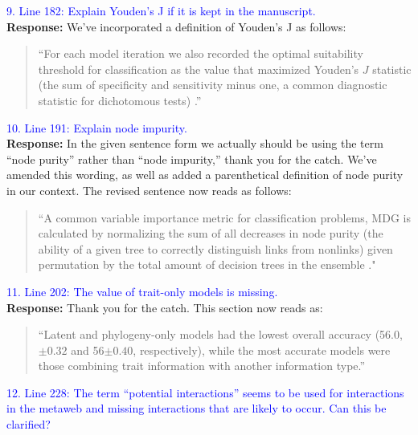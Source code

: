 \documentclass{article}
\begin{document}
\textcolor{blue}{9. Line 182: Explain Youden’s J if it is kept in the manuscript.} \\
\textbf{Response:} We’ve incorporated a definition of Youden’s J as follows: 
\begin{quote}
“For each model iteration we also recorded the optimal suitability threshold for classification as the value that maximized Youden's $J$ statistic (the sum of specificity and sensitivity minus one, a common diagnostic statistic for dichotomous tests) \cite{youden1950index}.”
\end{quote}

\textcolor{blue}{10. Line 191: Explain node impurity.} \\
\textbf{Response:} In the given sentence form we actually should be using the term “node purity” rather than “node impurity,” thank you for the catch. We’ve amended this wording, as well as added a parenthetical definition of node purity in our context. The revised sentence now reads as follows:  
\begin{quote}
``A common variable importance metric for classification problems, MDG is calculated by normalizing the sum of all decreases in node purity (the ability of a given tree to correctly distinguish links from nonlinks) given permutation by the total amount of decision trees in the ensemble \cite{khalilia2011predicting, calle2011stability}."
\end{quote}

\textcolor{blue}{11. Line 202: The value of trait-only models is missing.} \\
\textbf{Response:} Thank you for the catch. This section now reads as:
\begin{quote}
“Latent and phylogeny-only models had the lowest overall accuracy (56.0, $\pm 0.32$ and 56$\pm 0.40$, respectively), while the most accurate models were those combining trait information with another information type.”
\end{quote}

\textcolor{blue}{12. Line 228: The term “potential interactions” seems to be used for interactions in the metaweb and missing interactions that are likely to occur. Can this be clarified?} \\
\end{document}
